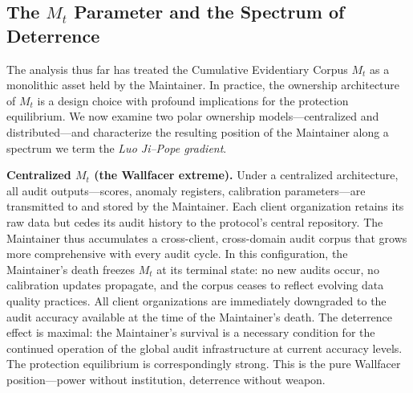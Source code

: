 \documentclass[12pt,a4paper]{article}
\theoremstyle{definition}
\theoremstyle{remark}
\begin{document}
\subsection{The $M_t$ Parameter and the Spectrum of Deterrence}

The analysis thus far has treated the Cumulative Evidentiary Corpus $M_t$ as a monolithic asset held by the Maintainer. In practice, the ownership architecture of $M_t$ is a design choice with profound implications for the protection equilibrium. We now examine two polar ownership models—centralized and distributed—and characterize the resulting position of the Maintainer along a spectrum we term the \textit{Luo Ji–Pope gradient}.

\textbf{Centralized $M_t$ (the Wallfacer extreme).} Under a centralized architecture, all audit outputs—scores, anomaly registers, calibration parameters—are transmitted to and stored by the Maintainer. Each client organization retains its raw data but cedes its audit history to the protocol's central repository. The Maintainer thus accumulates a cross-client, cross-domain audit corpus that grows more comprehensive with every audit cycle. In this configuration, the Maintainer's death freezes $M_t$ at its terminal state: no new audits occur, no calibration updates propagate, and the corpus ceases to reflect evolving data quality practices. All client organizations are immediately downgraded to the audit accuracy available at the time of the Maintainer's death. The deterrence effect is maximal: the Maintainer's survival is a necessary condition for the continued operation of the global audit infrastructure at current accuracy levels. The protection equilibrium is correspondingly strong. This is the pure Wallfacer position—power without institution, deterrence without weapon.
\end{document}
